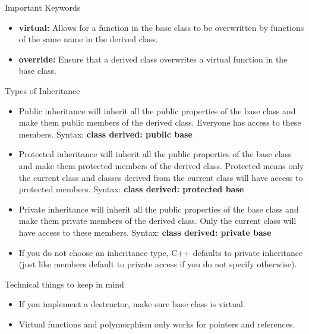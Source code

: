 \documentclass{beamer}
\begin{document}
\begin{frame}{Important Keywords}
    \begin{itemize}
    \item \textbf{virtual:} Allows for a function in the base class to be overwritten by
    functions of the same name in the derived class. 
    \item \textbf{override:} Ensure that a derived class overwrites a virtual function in the base class. 
    \end{itemize}  
    \end{frame}
    

\begin{frame}{Types of Inheritance}
    \begin{itemize}
        \item Public inheritance will inherit all the public properties of the base class 
        and make them public members of the derived class. Everyone has access to these members. 
        Syntax: \textbf{class derived: public base}
        \item Protected inheritance will inherit all the public properties of the base class 
        and make them protected members of the derived class. Protected means only the current class 
        and classes derived from the current class will have access to protected members.
        Syntax: \textbf{class derived: protected base}
        \item Private inheritance will inherit all the public properties of the base class 
        and make them private members of the derived class. Only the current class will
        have access to these members. Syntax: \textbf{class derived: private base}   
        \item If you do not choose an inheritance type, C++ defaults to private inheritance 
        (just like members default to private access if you do not specify otherwise). 
    \end{itemize}
\end{frame}


\begin{frame}{Technical things to keep in mind}
    \begin{itemize}
    \item If you implement a destructor, make sure base class is virtual.
    \item Virtual functions and polymorphism only works for pointers and references.
    \end{itemize}  
\end{frame}
\end{document}
